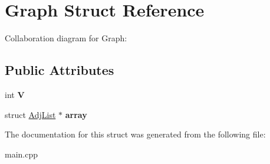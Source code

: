 \hypertarget{struct_graph}{}\section{Graph Struct Reference}
\label{struct_graph}


Collaboration diagram for Graph\+:
\subsection*{Public Attributes}
\begin{DoxyCompactItemize}
\item 
\mbox{\label{struct_graph_a2b722f7cfa7a21e4cb5fae488b3d4dcc}} 
int {\bfseries V}
\item 
\mbox{\label{struct_graph_a33138cfe84bb21a940ad2aa9a1a8c9eb}} 
struct \hyperlink{struct_adj_list}{Adj\+List} $\ast$ {\bfseries array}
\end{DoxyCompactItemize}


The documentation for this struct was generated from the following file\+:\begin{DoxyCompactItemize}
\item 
main.\+cpp\end{DoxyCompactItemize}
